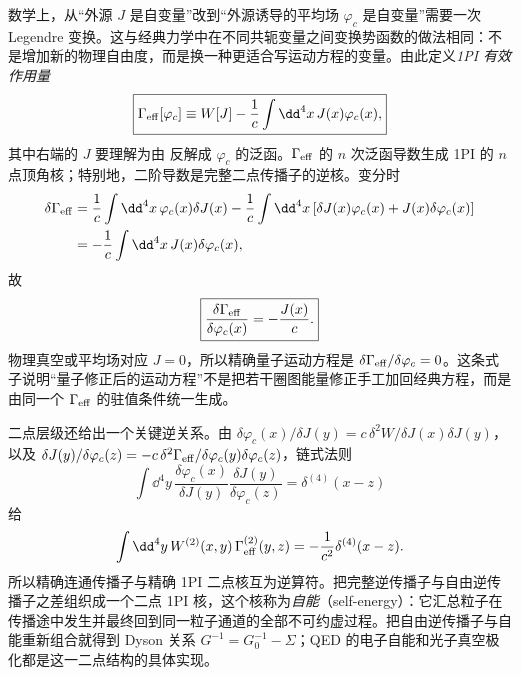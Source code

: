 数学上，从“外源 $J$ 是自变量”改到“外源诱导的平均场 $\varphi_c$ 是自变量”需要一次 Legendre 变换。这与经典力学中在不同共轭变量之间变换势函数的做法相同：不是增加新的物理自由度，而是换一种更适合写运动方程的变量。由此定义\emph{1PI 有效作用量}
\begin{equation}
\boxed{
\Gamma_{\rm eff}[\varphi_c]
\equiv W[J]
-\frac1c\int\dd^4 x\,J(x)\varphi_c(x),}
\label{eq:onepi_effective_action_definition}
\end{equation}
其中右端的 $J$ 要理解为由 反解成 $\varphi_c$ 的泛函。$\Gamma_{\rm eff}$ 的 $n$ 次泛函导数生成 1PI 的 $n$ 点顶角核；特别地，二阶导数是完整二点传播子的逆核。变分时
\begin{align*}
\delta\Gamma_{\rm eff}
&=\frac1c\int\dd^4 x\,\varphi_c(x)\delta J(x)
-\frac1c\int\dd^4 x\,[\delta J(x)\varphi_c(x)+J(x)\delta\varphi_c(x)]\\
&=-\frac1c\int\dd^4 x\,J(x)\delta\varphi_c(x),
\end{align*}
故
\begin{equation}
\boxed{
\frac{\delta\Gamma_{\rm eff}}{\delta\varphi_c(x)}=-\frac{J(x)}{c}.}
\label{eq:effective_action_eom}
\end{equation}
物理真空或平均场对应 $J=0$，所以精确量子运动方程是
$\delta\Gamma_{\rm eff}/\delta\varphi_c=0$。这条式子说明“量子修正后的运动方程”不是把若干圈图能量修正手工加回经典方程，而是由同一个 $\Gamma_{\rm eff}$ 的驻值条件统一生成。

二点层级还给出一个关键逆关系。由
$\delta\varphi_c(x)/\delta J(y)=c\,\delta^2W/\delta J(x)\delta J(y)$，以及
$\delta J(y)/\delta\varphi_c(z)=-c\,\delta^2\Gamma_{\rm eff}/\delta\varphi_c(y)\delta\varphi_c(z)$，链式法则
\[
\int\dd^4 y\,
\frac{\delta\varphi_c(x)}{\delta J(y)}
\frac{\delta J(y)}{\delta\varphi_c(z)}
=\delta^{(4)}(x-z)
\]
给
\begin{equation}
\int\dd^4 y\,
W^{(2)}(x,y)\,\Gamma_{\rm eff}^{(2)}(y,z)
=-\frac1{c^2}\delta^{(4)}(x-z).
\label{eq:connected_onepi_inverse_relation}
\end{equation}
所以精确连通传播子与精确 1PI 二点核互为逆算符。把完整逆传播子与自由逆传播子之差组织成一个二点 1PI 核，这个核称为\emph{自能}（self-energy）：它汇总粒子在传播途中发生并最终回到同一粒子通道的全部不可约虚过程。把自由逆传播子与自能重新组合就得到 Dyson 关系 $G^{-1}=G_0^{-1}-\Sigma$；QED 的电子自能和光子真空极化都是这一二点结构的具体实现。

